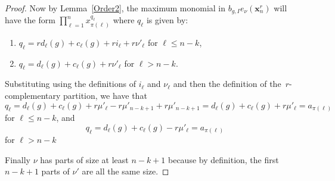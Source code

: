 \documentclass[ALCO,ThmDefs,Unicode,epreuves]{cedram}
\begin{document}
\begin{lemm}
\begin{proof}
	Now by Lemma~\ref{Order2}, the maximum monomial in $b_{g,I}e_\nu(\mathbf{x}_n^r)$ will have the form $\prod_{\ell=1}^n 
x_{\pi(\ell)}^{q_{\ell}}$ where $q_\ell$ is given by:

	\begin{enumerate}

		\item $q_\ell=rd_\ell(g)+c_\ell(g)+ri_\ell+r\nu'_\ell$ for $\ell\leq n-k$,

		\item $q_\ell=d_\ell(g)+c_\ell(g)+r\nu'_\ell$ for $\ell> n-k$.

	\end{enumerate}

Substituting using the definitions of $i_\ell$ and $\nu_\ell$ and then the definition of the~$r$-complementary partition, we 
have 
that
\begin{equation}
q_\ell=d_\ell(g)+c_\ell(g)+r\mu'_\ell-r\mu'_{n-k+1}+r\mu'_{n-k+1}=d_\ell(g)+c_\ell(g)+r\mu'_\ell=a_{\pi(\ell)
}
\end{equation}
for $\ell\leq n-k$, and
\begin{equation}
q_\ell=d_\ell(g)+c_\ell(g)-r\mu'_\ell=a_{\pi(\ell)}
\end{equation}
for $\ell>n-k$


Finally $\nu$ has parts of size at least $n-k+1$ because by definition, the first $n-k+1$ parts of $\nu'$ are all the same size.
	\end{proof}
\end{lemm}
\end{document}
